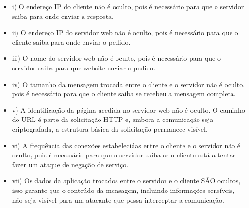 \documentclass{article}
\begin{document}
\begin{itemize}
    \item i) O endereço IP do cliente não é oculto, pois é necessário para que o servidor saiba para onde enviar a resposta.
    \item ii) O endereço IP do servidor web não é oculto, pois é necessário para que o cliente saiba para onde enviar o pedido.
    \item iii) O nome do servidor web não é oculto, pois é necessário para que o servidor saiba para que website enviar o pedido.
    \item iv) O tamanho da mensagem trocada entre o cliente e o servidor não é oculto, pois é necessário para que o cliente saiba se recebeu a mensagem completa.
    \item v) A identificação da página acedida no servidor web não é oculto. O caminho do URL é parte da solicitação HTTP e, embora a comunicação seja criptografada, a estrutura básica da solicitação permanece visível.
    \item vi) A frequência das conexões estabelecidas entre o cliente e o servidor não é oculto, pois é necessário para que o servidor saiba se o cliente está a tentar fazer um ataque de negação de serviço.
    \item vii) Os dados da aplicação trocados entre o servidor e o cliente SÃO ocultos, isso garante que o conteúdo da mensagem, incluindo informações sensíveis, não seja visível para um atacante que possa interceptar a comunicação. 
\end{itemize}
\end{document}
